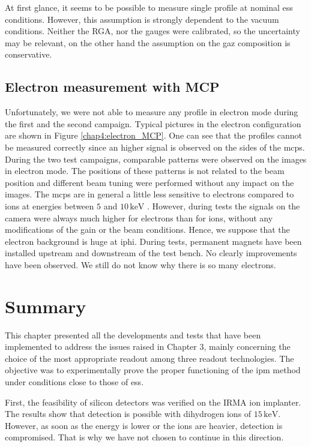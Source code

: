 \begin{refsection}
  At first glance, it seems to be possible to measure single profile at nominal \acrshort{ess} conditions. However, this assumption is strongly dependent to the vacuum conditions. Neither the RGA, nor the gauges were calibrated, so the uncertainty may be relevant, on the other hand the assumption on the gaz composition is conservative.

  

  \subsection{Electron measurement with MCP}
  Unfortunately, we were not able to measure any profile in electron mode during the first and the second campaign.
  Typical pictures in the electron configuration are shown in Figure \ref{chap4:electron_MCP}. One can see that the profiles cannot be measured correctly since an higher signal is observed on the sides of the \acrshort{mcp}s. During the two test campaigns, comparable patterns were observed on the images in electron mode. The positions of these patterns is not related to the beam position and different beam tuning were performed without any impact on the images.
  The \acrshort{mcp}s are in general a little less sensitive to electrons compared to ions at energies between $5$ and $10\,\mathrm{keV}$ \cite{Wiza1979}.
  However, during tests the signals on the camera were always much higher for electrons than for ions, without any modifications of the gain or the beam conditions.
  Hence, we suppose that the electron background is huge at \acrshort{iphi}.
  During tests, permanent magnets have been installed upstream and downstream of the test bench. No clearly improvements have been observed. We still do not know why there is so many electrons.
  

  \section{Summary}
  \label{ch4:Summary}
  This chapter presented all the developments and tests that have been implemented to address the issues raised in Chapter 3, mainly concerning the choice of the most appropriate readout among three readout technologies. The objective was to experimentally prove the proper functioning of the \acrshort{ipm} method under conditions close to those of \acrshort{ess}.

  First, the feasibility of silicon detectors was verified on the IRMA ion implanter. The results show that detection is possible with dihydrogen ions of $15\,\mathrm{keV}$. However, as soon as the energy is lower or the ions are heavier, detection is compromised. That is why we have not chosen to continue in this direction.


\end{refsection}
